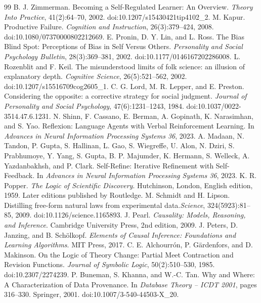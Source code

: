 \begin{thebibliography}{99}
 B. J. Zimmerman. Becoming a Self-Regulated Learner: An Overview. \emph{Theory Into Practice}, 41(2):64--70, 2002. doi:10.1207/s15430421tip4102\_2.
 M. Kapur. Productive Failure. \emph{Cognition and Instruction}, 26(3):379--424, 2008. doi:10.1080/07370000802212669.
 E. Pronin, D. Y. Lin, and L. Ross. The Bias Blind Spot: Perceptions of Bias in Self Versus Others. \emph{Personality and Social Psychology Bulletin}, 28(3):369--381, 2002. doi:10.1177/0146167202286008.
 L. Rozenblit and F. Keil. The misunderstood limits of folk science: an illusion of explanatory depth. \emph{Cognitive Science}, 26(5):521--562, 2002. doi:10.1207/s15516709cog2605\_1.
 C. G. Lord, M. R. Lepper, and E. Preston. Considering the opposite: a corrective strategy for social judgment. \emph{Journal of Personality and Social Psychology}, 47(6):1231--1243, 1984. doi:10.1037/0022-3514.47.6.1231.
 N. Shinn, F. Cassano, E. Berman, A. Gopinath, K. Narasimhan, and S. Yao. Reflexion: Language Agents with Verbal Reinforcement Learning. In \emph{Advances in Neural Information Processing Systems 36}, 2023.
 A. Madaan, N. Tandon, P. Gupta, S. Hallinan, L. Gao, S. Wiegreffe, U. Alon, N. Dziri, S. Prabhumoye, Y. Yang, S. Gupta, B. P. Majumder, K. Hermann, S. Welleck, A. Yazdanbakhsh, and P. Clark. Self-Refine: Iterative Refinement with Self-Feedback. In \emph{Advances in Neural Information Processing Systems 36}, 2023.
 K. R. Popper. \emph{The Logic of Scientific Discovery}. Hutchinson, London, English edition, 1959. Later editions published by Routledge.
 M. Schmidt and H. Lipson. Distilling free-form natural laws from experimental data.\linebreak \emph{Science}, 324(5923):81--85, 2009. doi:10.1126/science.1165893.
 J. Pearl. \emph{Causality: Models, Reasoning, and Inference}. Cambridge University Press, 2nd edition, 2009.
 J. Peters, D. Janzing, and B. Sch\"olkopf. \emph{Elements of Causal Inference: Foundations and Learning Algorithms}. MIT Press, 2017.
 C. E. Alchourr\'on, P. G\"ardenfors, and D. Makinson. On the Logic of Theory Change: Partial Meet Contraction and Revision Functions. \emph{Journal of Symbolic Logic}, 50(2):510--530, 1985. doi:10.2307/2274239.
 P. Buneman, S. Khanna, and W.-C. Tan. Why and Where: A Characterization of Data Provenance. In \emph{Database Theory -- ICDT 2001}, pages 316--330. Springer, 2001. doi:10.1007/3-540-44503-X\_20.

\end{thebibliography}
